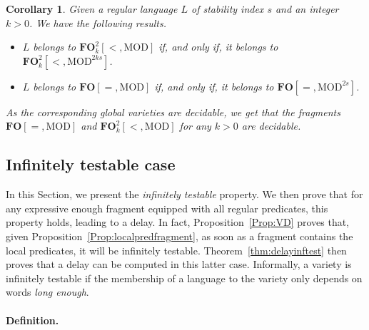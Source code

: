 \documentclass[submission,hidelink]{dmtcs-episciences}
\newtheorem{corollary}[theorem]{Corollary}
\newcommand{\FO}{\mathbf{FO}}
\newcommand{\MOD}{\mathrm{MOD}}
\begin{document}
		\begin{corollary}\label{FinRank-CorDecid}
		Given a regular language $L$ of stability index $s$ and an integer $k>0$. We have the following results.
		\begin{itemize}
			\item  $L$ belongs to $\FO^2_k[<,\MOD]$ if, and only if, it belongs to
		$\FO^2_k[<,\MOD^{2ks}]$.
			\item $L$ belongs to $\FO[=,\MOD]$ if, and only if, it belongs to	 $\FO[=,\MOD^{2s}]$.
		\end{itemize}

		As the corresponding global varieties are decidable, we get that the fragments $\FO[=,\MOD]$ and $\FO^2_k[<,\MOD]$ for any $k>0$ are decidable.
		\end{corollary}





\subsection{Infinitely testable case}\label{SsSection:InfTest}
	In this Section, we present the \emph{infinitely testable} property.
	We then prove that for any expressive enough fragment equipped with all regular predicates, this property holds, leading to a delay.
	In fact, Proposition~\ref{Prop:VD} proves that, given Proposition~\ref{Prop:localpredfragment}, as soon as a fragment contains the local predicates, it will be infinitely testable.
	Theorem~\ref{thm:delayinftest} then proves that a delay can be computed in this latter case.
	Informally, a variety is infinitely testable if the membership of a language
	to the variety only depends on words \emph{long enough}.
	\paragraph{Definition.}
\end{document}
